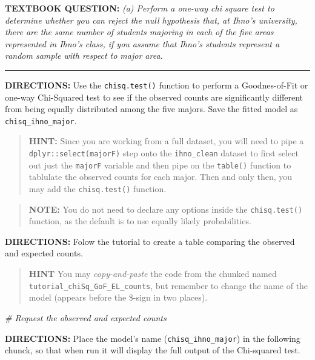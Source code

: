 \documentclass[
]{article}
\newenvironment{Shaded}{\begin{snugshade}}{\end{snugshade}}
\newcommand{\CommentTok}[1]{\textcolor[rgb]{0.56,0.35,0.01}{\textit{#1}}}
\begin{document}
\textbf{TEXTBOOK QUESTION:} \emph{(a) Perform a one-way chi square test
to determine whether you can reject the null hypothesis that, at Ihno's
university, there are the same number of students majoring in each of
the five areas represented in Ihno's class, if you assume that Ihno's
students represent a random sample with respect to major area.}

\begin{center}\rule{0.5\linewidth}{0.5pt}\end{center}

\textbf{DIRECTIONS:} Use the \texttt{chisq.test()} function to perform a
Goodnes-of-Fit or one-way Chi-Squared test to see if the observed counts
are significantly different from being equally distributed among the
five majors. Save the fitted model as \texttt{chisq\_ihno\_major}.

\begin{quote}
\textbf{HINT:} Since you are working from a full dataset, you will need
to pipe a \texttt{dplyr::select(majorF)} step onto the
\texttt{ihno\_clean} dataset to first select out just the
\texttt{majorF} variable and then pipe on the \texttt{table()} function
to tablulate the observed counts for each major. Then and only then, you
may add the \texttt{chisq.test()} function.
\end{quote}

\begin{quote}
\textbf{NOTE:} You do not need to declare any options inside the
\texttt{chisq.test()} function, as the default is to use equally likely
probabilities.
\end{quote}

\textbf{DIRECTIONS:} Folow the tutorial to create a table comparing the
observed and expected counts.

\begin{quote}
\textbf{HINT} You may \emph{copy-and-paste} the code from the chunked
named \texttt{tutorial\_chiSq\_GoF\_EL\_counts}, but remember to change
the name of the model (appears before the \$-sign in two places).
\end{quote}

\begin{Shaded}
\begin{Highlighting}[]
\CommentTok{\# Request the observed and expected counts}
\end{Highlighting}
\end{Shaded}

\textbf{DIRECTIONS:} Place the model's name
(\texttt{chisq\_ihno\_major}) in the following chunck, so that when run
it will display the full output of the Chi-squared test.
\end{document}
